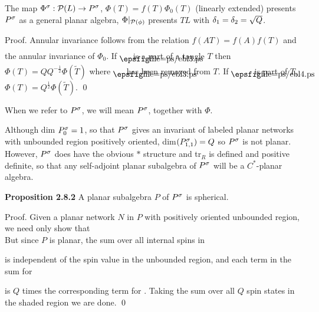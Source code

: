 \bs
{} The map $\Phi^\sigma:{\cal P}(L)\to P^\sigma$,
$\Phi(T)=f(T)\Phi_0(T)$ (linearly extended) presents $P^\sigma$ as a
general planar algebra, $\Phi |_{{\cal P}(\phi)}$  presents $TL$ with
$\delta_1=\delta_2=\sqrt{Q}$.

\bs
{\sc Proof.} Annular invariance follows from the relation
$f(AT)=f(A)f(T)$ and the annular invariance of $\Phi_0$.
If $\deye$ is a part of a tangle $T$ then
$\Phi(T)=QQ^{-\frac 12} \Phi(\tilde T)$ where $\deye$
has been removed from $T$. If $\deyer$\ \ \  is part of $T$,
$\Phi(T)=Q^{\frac 12} \Phi(\tilde T)$. \qed

\bs
When we refer to $P^\sigma$, we will mean $P^\sigma$,
together with $\Phi$.

Although dim $P^\sigma_0=1$, so that $P^\sigma$ gives an invariant of
labeled planar networks with unbounded region positively oriented,
dim$(P^\sigma_{1,1})=Q$ so $P^\sigma$ is not planar. However, $P^\sigma$
does have the obvious $*$ structure and tr${}_R$ is defined and
positive definite, so that any self-adjoint planar
subalgebra of
$P^\sigma$ will be a $C^*$-planar algebra.

\bs\ni
{\bf Proposition 2.8.2} A planar subalgebra $P$ of
$P^\sigma$ is spherical.

\bs
{\sc Proof.} Given a planar network $N$ in $P$ with positively
oriented unbounded region, we need only show that
\[
        
\]
\ni But since $P$ is planar, the sum over all internal spins in

is independent of the spin value in the unbounded
region, and each term in the sum for 

is $Q$ times the
corresponding term for
. Taking the sum over all $Q$
spin states in the shaded region we are done. \qed


